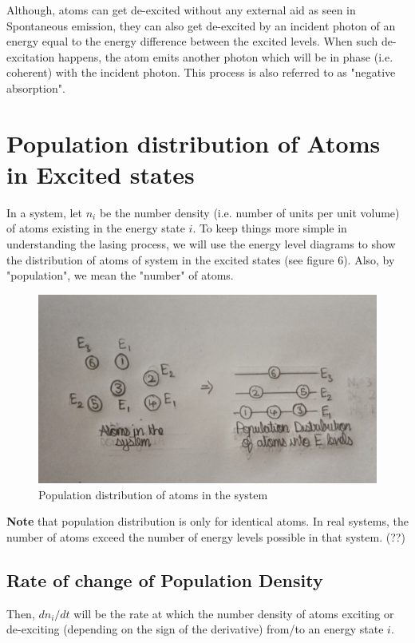 \documentclass[12pt]{article}
\begin{document}
Although, atoms can get de-excited without any external aid as seen in Spontaneous emission, they can also get de-excited by an incident photon of an energy equal to the energy difference between the excited levels. When such de-excitation happens, the atom emits another photon which will be in phase (i.e. coherent) with the incident photon. This process is also referred to as "negative absorption".

\section{Population distribution of Atoms in Excited states}

In a system, let $n_{i}$ be the number density (i.e. number of units per unit volume) of atoms existing in the energy state $i$. To keep things more simple in understanding the lasing process, we will use the energy level diagrams to show the distribution of atoms of system in the excited states (see figure 6). Also, by "population", we mean the "number" of atoms.

\begin{figure}[H]
    \centering
    \includegraphics[scale=.8]{./img/06_population_dist.png}
    \caption{Population distribution of atoms in the system}
\end{figure}

\textbf{Note} that population distribution is only for identical atoms. In real systems, the number of atoms exceed the number of energy levels possible in that system. (??)

\subsection{Rate of change of Population Density}

Then, $dn_{i}/dt$ will be the rate at which the number density of atoms exciting or de-exciting (depending on the sign of the derivative) from/to an energy state $i$. \vspace{.2cm}
\end{document}

